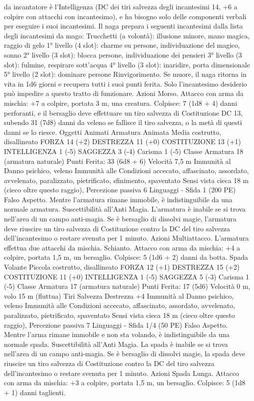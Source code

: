 \begin{multicols}{2}
da incantatore è l’Intelligenza (DC dei tiri salvezza degli
incantesimi 14, +6 a colpire con attacchi con incantesimo), e ha
bisogno solo delle componenti verbali per eseguire i suoi
incantesimi. Il naga prepara i seguenti incantesimi dalla lista
degli incantesimi da mago:
Trucchetti (a volontà): illusione minore, mano magica, raggio di
gelo
1° livello (4 slot): charme su persone, individuazione del magico,
sonno
2° livello (3 slot): blocca persone, individuazione dei pensieri
3° livello (3 slot): fulmine, respirare sott'acqua
4° livello (3 slot): inaridire, porta dimensionale
5° livello (2 slot): dominare persone
Rinvigorimento. Se muore, il naga ritorna in vita in 1d6 giorni e
recupera tutti i suoi punti ferita. Solo l’incantesimo desiderio può
impedire a questo tratto di funzionare.
Azioni
Morso. Attacco con arma da mischia: +7 a colpire, portata 3 m,
una creatura.
Colpisce: 7 (1d8 + 4) danni perforanti, e il bersaglio deve
effettuare un tiro salvezza di Costituzione DC 13, subendo 31
(7d8) danni da veleno se fallisce il tiro salvezza, o la metà di
questi danni se lo riesce.
Oggetti Animati
Armatura Animata
Media costrutto, disallineato
FORZA 14 (+2)
DESTREZZA 11 (+0)
COSTITUZIONE 13 (+1)
INTELLIGENZA 1 (-5)
SAGGEZZA 3 (-4)
Carisma 1 (-5)
Classe Armatura 18 (armatura naturale)
\hspace*{0pt}\hfill{Punti Ferita}: 33 (6d8 + 6)
Velocità 7,5 m
Immunità al Danno psichico, veleno
Immunità alle Condizioni accecato, affascinato, assordato,
avvelenato, paralizzato, pietrificato, sfinimento, spaventato
Sensi vista cieca 18 m (cieco oltre questo raggio), Percezione
passiva 6
Linguaggi -
Sfida 1 (200 PE)
Falso Aspetto. Mentre l’armatura rimane immobile, è
indistinguibile da una normale armatura.
Suscettibilità all’Anti Magia. L’armatura è inabile se si trova
nell’area di un campo anti-magia. Se è bersaglio di dissolvi
magie, l’armatura deve riuscire un tiro salvezza di Costituzione
contro la DC del tiro salvezza dell’incantesimo o restare svenuta
per 1 minuto.
Azioni
Multiattacco. L’armatura effettua due attacchi da mischia.
Schianto. Attacco con arma da mischia: +4 a colpire, portata 1,5
m, un bersaglio.
Colpisce: 5 (1d6 + 2) danni da botta.
Spada Volante
Piccola costrutto, disallineato
FORZA 12 (+1)
DESTREZZA 15 (+2)
COSTITUZIONE 11 (+0)
INTELLIGENZA 1 (-5)
SAGGEZZA 5 (-3)
Carisma 1 (-5)
Classe Armatura 17 (armatura naturale)
\hspace*{0pt}\hfill{Punti Ferita}: 17 (5d6)
Velocità 0 m, volo 15 m (fluttua)
Tiri Salvezza Destrezza +4
Immunità al Danno psichico, veleno
Immunità alle Condizioni accecato, affascinato, assordato,
avvelenato, paralizzato, pietrificato, spaventato
Sensi vista cieca 18 m (cieco oltre questo raggio), Percezione
passiva 7
Linguaggi -
Sfida 1/4 (50 PE)
Falso Aspetto. Mentre l’arma rimane immobile e non sta
volando, è indistinguibile da una normale spada.
Suscettibilità all’Anti Magia. La spada è inabile se si trova
nell’area di un campo anti-magia. Se è bersaglio di dissolvi
magie, la spada deve riuscire un tiro salvezza di Costituzione
contro la DC del tiro salvezza dell’incantesimo o restare svenuta
per 1 minuto.
Azioni
Spada Lunga. Attacco con arma da mischia: +3 a colpire,
portata 1,5 m, un bersaglio.
Colpisce: 5 (1d8 + 1) danni taglienti.
 

\end{multicols}
